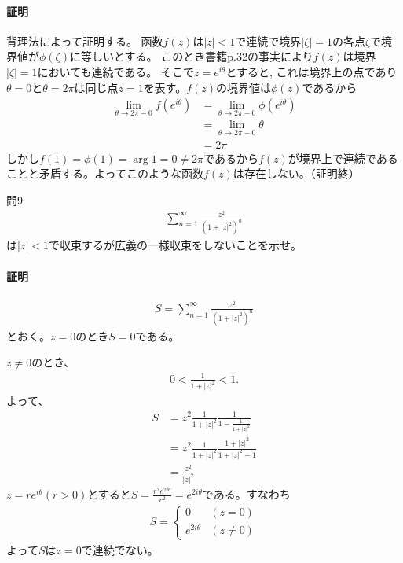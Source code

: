 \paragraph{証明}
背理法によって証明する。
函数$f(z)$は$|z|<1$で連続で境界$|\zeta|=1$の各点$\zeta$で境界値が$\phi(\zeta)$に等しいとする。
このとき書籍p.32の事実により$f(z)$は境界$|\zeta|=1$においても連続である。
そこで$z=e^{i\theta}$とすると,
これは境界上の点であり$\theta=0$と$\theta=2\pi$は同じ点$z=1$を表す。$f(z)$の境界値は$\phi(z)$であるから
\begin{align*}
    \lim_{\theta\to 2\pi-0}f(e^{i\theta})
    &=\lim_{\theta\to 2\pi-0}\phi(e^{i\theta})\\
    &=\lim_{\theta\to 2\pi-0}\theta\\
    &=2\pi
\end{align*}
しかし$f(1)=\phi(1)=\arg 1=0\neq 2\pi$であるから$f(z)$が境界上で連続であることと矛盾する。よってこのような函数$f(z)$は存在しない。（証明終）

\begin{mysimplebox}{問9}
    \begin{align*}
        \sum_{n=1}^{\infty}\frac{z^2}{(1+|z|^2)^n}
    \end{align*}
    は$|z|<1$で収束するが広義の一様収束をしないことを示せ。
\end{mysimplebox}
\paragraph{証明}
\begin{align*}
    S=\sum_{n=1}^{\infty}\frac{z^2}{(1+|z|^2)^n}
\end{align*}
とおく。$z=0$のとき$S=0$である。

$z\neq 0$のとき、
\begin{align*}
    0<\frac{1}{1+|z|^2}<1.
\end{align*}
よって、
\begin{align*}
    S&=z^2\frac{1}{1+|z|^2}\frac{1}{1-\frac{1}{1+|z|^2}}\\
    &=z^2\frac{1}{1+|z|^2}\frac{1+|z|^2}{1+|z|^2-1}\\
    &=\frac{z^2}{|z|^2}
\end{align*}
$z=re^{i\theta} (r>0)$とすると$S=\frac{r^2e^{2i\theta}}{r^2}=e^{2i\theta}$である。すなわち
\begin{align*}
    S=\left\{
        \begin{array}{cc}
            0 & (z=0)\\
            e^{2i\theta} & (z\neq 0)
        \end{array}
    \right.
\end{align*}
よって$S$は$z=0$で連続でない。

